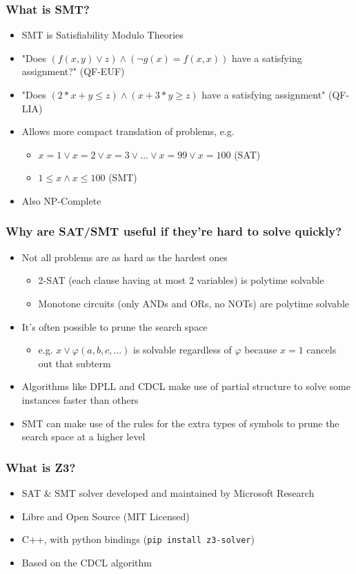 \documentclass[aspectratio=169]{beamer}
\begin{document}
\begin{frame}[fragile]
\frametitle{What is SMT?}
\begin{itemize}
\item SMT is Satisfiability Modulo Theories
\item "Does $(f(x,y) \lor z) \land (\neg g(x) = f(x, x))$ have a satisfying assignment?" (QF-EUF)
\item "Does $(2*x+y \le z) \land (x+3*y \ge z)$ have a satisfying assignment" (QF-LIA)
\item Allows more compact translation of problems, e.g.
\begin{itemize}
\item $x = 1 \lor x = 2 \lor x = 3 \lor \hdots \lor x = 99 \lor x = 100$ (SAT)
\item $1 \le x \land x \le 100$ (SMT)
\end{itemize}
\item Also NP-Complete
\end{itemize}
\end{frame}

\begin{frame}[fragile]
\frametitle{Why are SAT/SMT useful if they're hard to solve quickly?}
\begin{itemize}
\item Not all problems are as hard as the hardest ones
\begin{itemize}
\item 2-SAT (each clause having at most 2 variables) is polytime solvable
\item Monotone circuits (only ANDs and ORs, no NOTs) are polytime solvable
\end{itemize}
\item It's often possible to prune the search space 
\begin{itemize}
\item e.g. $x \lor \varphi(a, b, c, \hdots)$ is solvable regardless of $\varphi$ because $x=1$ cancels out that subterm
\end{itemize}
\item Algorithms like DPLL and CDCL make use of partial structure to solve some instances faster than others
\item SMT can make use of the rules for the extra types of symbols to prune the search space at a higher level
\end{itemize}
\end{frame}

\begin{frame}[fragile]
\frametitle{What is Z3?}
\begin{itemize}
\item SAT \& SMT solver developed and maintained by Microsoft Research
\item Libre and Open Source (MIT Licensed)
\item C++, with python bindings (\verb|pip install z3-solver|)
\item Based on the CDCL algorithm
\end{itemize}
\end{frame}
\end{document}
